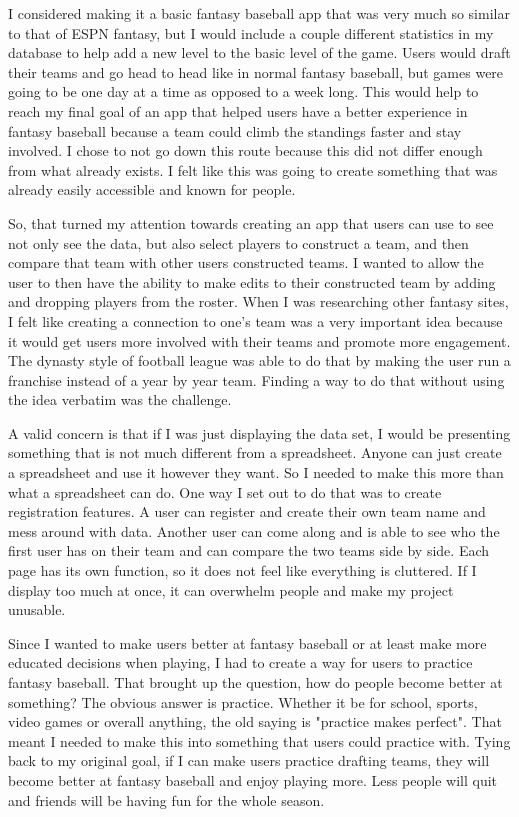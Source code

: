 \documentclass[10pt,twocolumn]{article}
\begin{document}
	I considered making it a basic fantasy baseball app that was very much so similar to that of ESPN fantasy, but I would include a couple different statistics in my database to help add a new level to the basic level of the game. Users would draft their teams and go head to head like in normal fantasy baseball, but games were going to be one day at a time as opposed to a week long. This would help to reach my final goal of an app that helped users have a better experience in fantasy baseball because a team could climb the standings faster and stay involved. I chose to not go down this route because this did not differ enough from what already exists. I felt like this was going to create something that was already easily accessible and known for people.
	
	So, that turned my attention towards creating an app that users can use to see not only see the data, but also select players to construct a team, and then compare that team with other users constructed teams. I wanted to allow the user to then have the ability to make edits to their constructed team by adding and dropping players from the roster. When I was researching other fantasy sites, I felt like creating a connection to one's team was a very important idea because it would get users more involved with their teams and promote more engagement. The dynasty style of football league was able to do that by making the user run a franchise instead of a year by year team. Finding a way to do that without using the idea verbatim was the challenge.
	
	A valid concern is that if I was just displaying the data set, I would be presenting something that is not much different from a spreadsheet. Anyone can just create a spreadsheet and use it however they want. So I needed to make this more than what a spreadsheet can do. One way I set out to do that was to create registration features. A user can register and create their own team name and mess around with data. Another user can come along and is able to see who the first user has on their team and can compare the two teams side by side. Each page has its own function, so it does not feel like everything is cluttered. If I display too much at once, it can overwhelm people and make my project unusable. 
	
		Since I wanted to make users better at fantasy baseball or at least make more educated decisions when playing, I had to create a way for users to practice fantasy baseball. That brought up the question, how do people become better at something? The obvious answer is practice. Whether it be for school, sports, video games or overall anything, the old saying is "practice makes perfect".  That meant I needed to make this into something that users could practice with. Tying back to my original goal, if I can make users practice drafting teams, they will become better at fantasy baseball and enjoy playing more. Less people will quit and friends will be having fun for the whole season.
			
\end{document}
